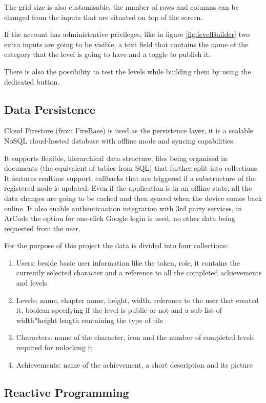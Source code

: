 \documentclass[12 pct]{report}
\begin{document}
The grid size is also customisable, the number of rows and columns can be changed from the inputs that are situated on top of the screen. 

If the account has administrative privileges, like in figure \ref{fig:levelBuilder} two extra inputs are going to be visible, a text field that contains the name of the category that the level is going to have and a toggle to publish it. 

There is also the possibility to test the levels while building them by using the dedicated button.
\subsection*{Data Persistence}
Cloud Firestore (from FireBase) is used as the persistence layer, it is a scalable NoSQL cloud-hosted database with offline mode and syncing capabilities.

It supports flexible, hierarchical data structure, files being organised in documents (the equivalent of tables from SQL) that further split into collections. It features realtime support, callbacks that are triggered if a substructure of the registered node is updated. Even if the application is in an offline state, all the data changes are going to be cached and then synced when the device comes back online. It also enable authenticaation integration with 3rd party services, in ArCode the option for one-click Google login is used, no other data being requested from the user.

For the purpose of this project the data is divided into four collections:
\begin{enumerate}
\item Users: beside basic user information like the token, role, it contains the currently selected character and a reference to all the completed achievements and levels
\item Levels: name, chapter name, height, width, reference to the user that created it, boolean specifying if the level is public or not and a sub-list of width*height length containing the type of tile
\item Characters: name of the character, icon and the number of completed levels required for unlocking it
\item Achievements: name of the achievement, a short description and its picture
\end{enumerate}

\subsection*{Reactive Programming}
\end{document}
